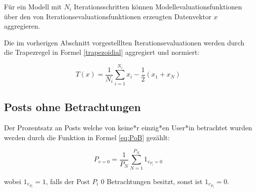 Für ein Modell mit $N_i$ Iterationsschritten können 
Modellevaluationsfunktionen über den von Iterationsevaluationsfunktionen erzeugten Datenvektor $x$ aggregieren. 

Die im vorherigen Abschnitt vorgestelllten Iterationsevaluationen werden durch die Trapezregel in Formel \ref{trapezoidial} aggregiert und normiert:

\begin{equation}
\label{trapezoidial}
T(x) = \frac{1}{N_i}\sum_{i = 1}^{N_i}x_i - \frac{1}{2}(x_1 + x_N)
\end{equation}

\subsection{Posts ohne Betrachtungen}

Der Prozentsatz an Posts welche von keine*r einzig*en User*in betrachtet wurden werden durch die Funktion in Formel \ref{eq:PoB} gezählt:

\begin{equation}
\label{eq:PoB}
P_{v = 0} = \frac{1}{P_N}\sum_{N = 1}^{P_N} 1_{v_{P_i} = 0}
\end{equation}

wobei $1_{v_{P_i}} = 1$, falls der Post $P_i$ $0$ Betrachtungen besitzt, sonst ist $1_{v_{P_i}} = 0$.

 












